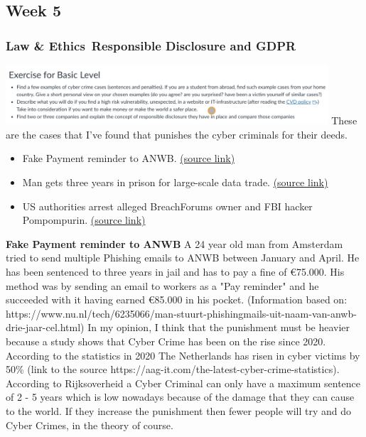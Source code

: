 \documentclass[12pt, letterpaper]{article}
\begin{document}
\subsection{Week 5}
\hfill\break
\subsubsection{Law \& Ethics\, Responsible Disclosure and GDPR}
\includegraphics[width=0.9\textwidth]{fotos/Week 5/Assignment laws and ethics.jpeg}
\hfill\break
These are the cases that I've found that punishes the cyber criminals for their deeds.
\begin{itemize}
    \item Fake Payment reminder to ANWB. \href{https://www.nu.nl/tech/6235066/man-stuurt-phishingmails-uit-naam-van-anwb-drie-jaar-cel.html}{(source link)}
    \item Man gets three years in prison for large-scale data trade. \href{https://www.nu.nl/tech/6205158/man-krijgt-drie-jaar-cel-voor-grootschalige-datahandel.html}{(source link)}
    \item US authorities arrest alleged BreachForums owner and FBI hacker Pompompurin. \href{https://www.engadget.com/us-authorities-arrest-alleged-breachforums-owner-and-fbi-hacker-pompompurin-170009266.html?guccounter=1&guce_referrer=aHR0cHM6Ly9kdWNrZHVja2dvLmNvbS8&guce_referrer_sig=AQAAAEQpBy2kyPUw8ATdF7w0YnJKYmFnjlXQBih0kfhNxBKIz72UCOUpxu9292uBgp_UYr943Ch6jme-7qPjiaPoIvwA0tF3gzqrTQ53lsHHJLU7iIAFF4HlycLB-xIWOjEry79rP-CuyE__yIWz8JT8XhYLqHe6qQjX4liyn7WTZRug}{(source link)}
\end{itemize}
\newpage
\textbf{Fake Payment reminder to ANWB}
\hfill\break
A 24 year old man from Amsterdam tried to send multiple Phishing emails to ANWB between January and April. He has been sentenced to three years in jail and has to pay a fine of €75.000. His method was by sending an email to workers as a "Pay reminder" and he succeeded with it having earned €85.000 in his pocket. (Information based on: https://www.nu.nl/tech/6235066/man-stuurt-phishingmails-uit-naam-van-anwb-drie-jaar-cel.html)
\hfill\break
\hfill\break
In my opinion, I think that the punishment must be heavier because a study shows that Cyber Crime has been on the rise since 2020. According to the statistics in 2020 The Netherlands has risen in cyber victims by 50\% (link to the source https://aag-it.com/the-latest-cyber-crime-statistics). According to Rijksoverheid a Cyber Criminal can only have a maximum sentence of 2 - 5 years which is low nowadays because of the damage that they can cause to the world. If they increase the punishment then fewer people will try and do Cyber Crimes, in the theory of course.
\end{document}
